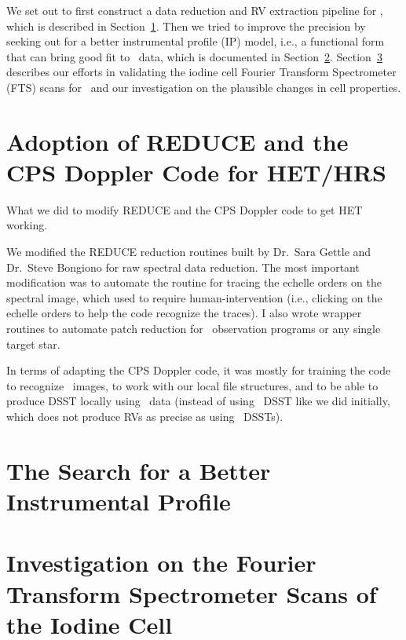 We set out to first construct a data reduction and RV extraction
pipeline for \het, which is described in
Section~\ref{het:sec:pipeline}. Then we tried to improve the precision
by seeking out for a better instrumental profile (IP) model, i.e., a
functional form that can bring good fit to \het\ data, which is
documented in Section~\ref{het:sec:ip}. Section~\ref{het:sec:fts}
describes our efforts in validating the iodine cell Fourier Transform
Spectrometer (FTS) scans for \het\ and our investigation on the
plausible changes in cell properties.



\section{Adoption of REDUCE and the CPS Doppler Code for HET/HRS}\label{het:sec:pipeline}

What we did to modify REDUCE and the CPS Doppler code to get HET working.

We modified the REDUCE reduction routines built by Dr.\ Sara Gettle
and Dr.\ Steve Bongiono for raw spectral data reduction. The most
important modification was to automate the routine for tracing the
echelle orders on the spectral image, which used to require
human-intervention (i.e., clicking on the echelle orders to help the
code recognize the traces). I also wrote wrapper routines to automate
patch reduction for \het\ observation programs or any single target
star.

In terms of adapting the CPS Doppler code, it was mostly for training
the code to recognize \het\ images, to work with our local file
structures, and to be able to produce DSST locally using \het\ data
(instead of using \keck\ DSST like we did initially, which does not
produce RVs as precise as using \het\ DSSTs).



\section{The Search for a Better Instrumental Profile}\label{het:sec:ip}




\section{Investigation on the Fourier Transform Spectrometer Scans of the Iodine Cell}\label{het:sec:fts}


